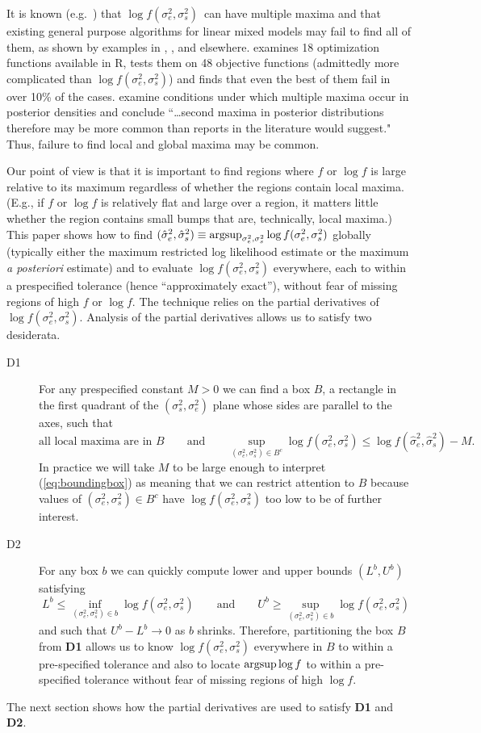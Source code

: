 \documentclass{report}
\newcommand{\textcompute}{\textsf}
\newcommand{\R}{\textcompute{R}\xspace}
\newcommand{\RL}{f}
\newcommand{\logRL}{\log\RL}
\newcommand{\sigssq}{\sigma_s^2}
\newcommand{\sigesq}{\sigma_e^2}
\newcommand{\sshat}{\hat\sigma^2_e,\hat\sigma^2_s}
\newcommand{\logRLss}{\logRL(\sigesq,\sigssq)}
\newcommand{\argsup}{\operatornamewithlimits{argsup}}
\begin{document}
It is known (e.g.\ \citealt{henn&hodges:2014}) that $\logRLss$\  
can have multiple maxima and that existing general purpose algorithms for linear mixed models may fail to find all of them, as shown by examples in \cite{hodges:2013}, \cite{henn&hodges:2014}, and elsewhere.
\cite{mullen:2014} examines 18 optimization functions available in \R, tests them on 48 objective functions (admittedly more complicated than $\logRLss$) and finds that even the best of them fail in over 10\% of the cases.  \cite{henn&hodges:2014} examine conditions under which multiple maxima occur in posterior densities and conclude ``\dots second maxima in posterior distributions therefore may be more common than reports in the literature would suggest."  Thus, failure to find local and global maxima may be common.  

Our point of view is that it is important to find regions where $f$ or $\log f$ is large relative to its maximum regardless of whether the regions contain local maxima.  (E.g., if $f$ or $\log f$ is relatively flat and large over a region, it matters little whether the region contains small bumps that are, technically, local maxima.)  This paper shows how to find $(\sshat) \equiv \argsup_{\sigesq, \sigssq}\logRLss$ globally (typically either the maximum restricted log likelihood estimate or the maximum \textit{a posteriori} estimate) and to evaluate $\logRLss$ everywhere, each to within a prespecified tolerance (hence ``approximately exact''), without fear of missing regions of high $f$ or $\logRL$.  The technique relies on the partial derivatives of $\logRLss$.  Analysis of the partial derivatives allows us to satisfy two desiderata.
\begin{description}
\item[D1] For any prespecified constant $M>0$ we can find a box $B$, a rectangle in the first quadrant of the $(\sigssq, \sigesq)$ plane whose sides are parallel to the axes, such that
\begin{equation}
\label{eq:boundingbox}
	\text{all local maxima are in $B$} \qquad \text{and} \qquad \sup_{(\sigesq, \sigssq) \in B^c} \logRLss \le \logRL(\sshat) - M.
\end{equation}
In practice we will take $M$ to be large enough to interpret (\ref{eq:boundingbox}) as meaning that we can restrict attention to $B$ because values of $(\sigesq, \sigssq) \in B^c$ have $\logRLss$ too low to be of further interest.

\item[D2] For any box $b$ we can quickly compute lower and upper bounds $(L^b,U^b)$ satisfying
\begin{equation*}
  L^b \le \inf_{(\sigesq, \sigssq) \in b}\logRLss \qquad\text{and}\qquad
  U^b \ge \sup_{(\sigesq, \sigssq) \in b}\logRLss
\end{equation*}
and such that $U^b-L^b \rightarrow 0$ as $b$ shrinks.  Therefore, partitioning the box $B$ from \textbf{D1} allows us to know $\logRLss$ everywhere in $B$ to within a pre-specified tolerance and also to locate $\argsup\logRL$ to within a pre-specified tolerance without fear of missing regions of high $\logRL$.
\end{description}
The next section shows how the partial derivatives are used to satisfy \textbf{D1} and \textbf{D2}.
\end{document}
